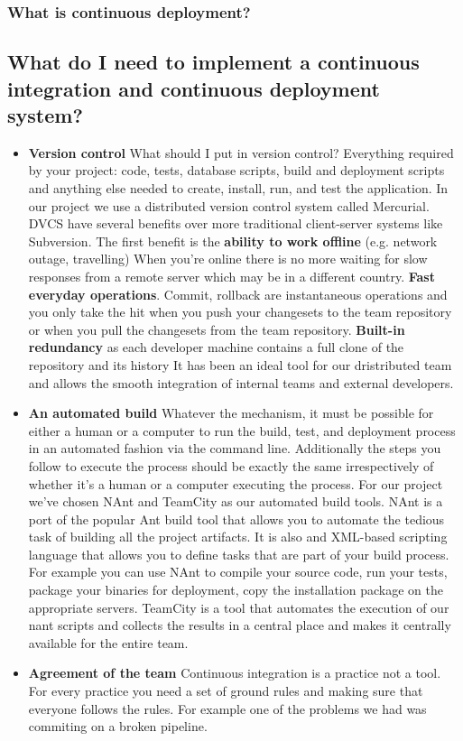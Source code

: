 \documentclass{article}
\begin{document}
\subsubsection*{What is continuous deployment?}

\subsection{What do I need to implement a continuous integration and continuous deployment system?}

\begin{itemize}
\item \textbf{Version control}
%
What should I put in version control?
%
Everything required by your project: code, tests, database scripts,
build and deployment scripts and anything else needed to create,
install, run, and test the application.
%
In our project we use a distributed version control system called
Mercurial.
%
DVCS have several benefits over more traditional client-server systems
like Subversion.
%
The first benefit is the \textbf{ability to work offline} (e.g. network outage,
travelling)
%
When you're online there is no more waiting for slow responses from a
remote server which may be in a different country.
%
\textbf{Fast everyday operations}. Commit, rollback are instantaneous
operations and you only take the hit when you push your changesets to
the team repository or when you pull the changesets from the team
repository.
%
\textbf{Built-in redundancy} as each developer machine contains a full
clone of the repository and its history
%
It has been an ideal tool for our dristributed team and allows the
smooth integration of internal teams and external developers.
%
\item \textbf{An automated build} 
%
Whatever the mechanism, it must be possible for either a human or a
computer to run the build, test, and deployment process in an
automated fashion via the command line.
%
Additionally the steps you follow to execute the process should be
exactly the same irrespectively of whether it's a human or a computer
executing the process.
%
For our project we've chosen NAnt and TeamCity as our automated build
tools.
%
NAnt is a port of the popular Ant build tool that allows you to
automate the tedious task of building all the project artifacts.
%
It is also and XML-based scripting language that allows you to define
tasks that are part of your build process.
%
For example you can use NAnt to compile your source code, run your
tests, package your binaries for deployment, copy the installation
package on the appropriate servers.
%
TeamCity is a tool that automates the execution of our nant scripts
and collects the results in a central place and makes it centrally
available for the entire team.
%
\item \textbf{Agreement of the team} 
%
Continuous integration is a practice not a tool.
%
For every practice you need a set of ground rules and making sure
that everyone follows the rules.
%
For example one of the problems we had was commiting on a broken
pipeline.
\end{itemize}
\end{document}
